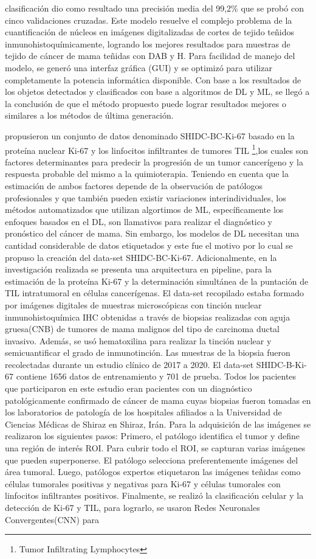 clasificación dio como resultado una precisión media del 99,2\% que se probó con cinco validaciones cruzadas. Este modelo resuelve el complejo problema de la cuantificación de núcleos en imágenes digitalizadas de cortes de tejido teñidos inmunohistoquímicamente, logrando los mejores resultados para muestras de tejido de cáncer de mama teñidas con DAB y H. Para facilidad de manejo del modelo, se generó una interfaz gráfica (GUI) y se optimizó para utilizar completamente la potencia informática disponible. Con base a los resultados de los objetos detectados y clasificados con base a algoritmos de DL y ML, se llegó a la conclusión de que el método propuesto puede lograr resultados mejores o similares a los métodos de última generación. 

\citep{Negahbani2021} propusieron un conjunto de datos denominado SHIDC-BC-Ki-67 basado en la proteína nuclear Ki-67 y los linfocitos infiltrantes de tumores TIL \footnote{Tumor Infiltrating Lymphocytes},los cuales son factores determinantes para predecir la progresión de un tumor cancerígeno y  la respuesta probable del mismo a la quimioterapia. Teniendo en cuenta que la estimación de ambos factores depende de la observación de patólogos profesionales y que también pueden existir variaciones interindividuales, los métodos automatizados que utilizan algortimos de ML, específicamente los enfoques basados en el DL, son llamativos para realizar el diagnóstico y pronóstico del cáncer de mama. Sin embargo, los modelos de DL necesitan una cantidad considerable de datos etiquetados y este fue el motivo por lo cual se propuso la creación del data-set SHIDC-BC-Ki-67. Adicionalmente, en la investigación realizada se presenta una arquitectura en pipeline, para la estimación de la proteína Ki-67 y la determinación simultánea de la puntación de TIL intratumoral en células cancerígenas. El data-set recopilado estaba formado por imágenes digitales de muestras microscópicas con tinción nuclear inmunohistoquímica IHC obtenidas a través de biopsias realizadas con aguja gruesa(CNB) de tumores de mama malignos del tipo de carcinoma ductal invasivo. Además, se usó hematoxilina para realizar la tinción nuclear y semicuantificar el grado de inmunotinción. Las muestras de la biopsia fueron recolectadas durante un estudio clínico de 2017 a 2020. El data-set SHIDC-B-Ki-67 contiene 1656 datos de entrenamiento y 701 de prueba. Todos los pacientes que participaron en este estudio eran pacientes con un diagnóstico patológicamente confirmado de cáncer de mama cuyas biopsias fueron tomadas en los laboratorios de patología de los hospitales afiliados a la Universidad de Ciencias Médicas de Shiraz en Shiraz, Irán. Para la adquisición de las imágenes se realizaron los siguientes pasos: Primero, el patólogo identifica el tumor y define una región de interés ROI. Para cubrir todo el ROI, se capturan varias imágenes que pueden superponerse. El patólogo selecciona preferentemente imágenes del área tumoral. Luego, patólogos expertos etiquetaron las imágenes teñidas como células tumorales positivas y negativas para Ki-67 y células tumorales con linfocitos infiltrantes positivos. Finalmente, se realizó la clasificación celular y la detección de Ki-67 y TIL, para lograrlo, se usaron Redes Neuronales Convergentes(CNN) para 